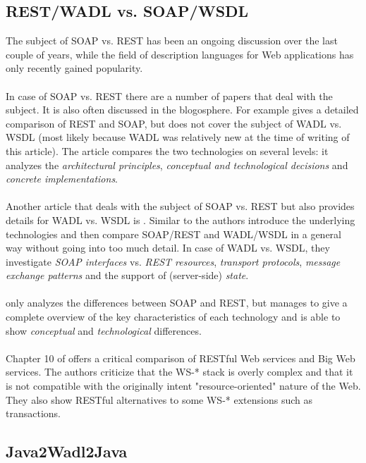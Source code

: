\subsection{REST/WADL vs. SOAP/WSDL}
The subject of SOAP vs. REST has been an ongoing discussion over the last couple of years, while the field of description languages for Web applications has only recently gained popularity.
\\ \\
In case of SOAP vs. REST there are a number of papers that deal with the subject. It is also often discussed in the blogosphere. For example \cite{BIGREST} gives a detailed comparison of REST and SOAP, but does not cover the subject of WADL vs. WSDL (most likely because WADL was relatively new at the time of writing of this article). The article compares the two technologies on several levels: it analyzes the \emph{architectural principles}, \emph{conceptual and technological decisions} and \emph{concrete implementations}.
\\ \\
Another article that deals with the subject of SOAP vs. REST but also provides details for WADL vs. WSDL is \cite{WADLWSDL}. Similar to \cite{BIGREST} the authors introduce the underlying technologies and then compare SOAP/REST and WADL/WSDL in a general way without going into too much detail. In case of WADL vs. WSDL, they investigate \emph{SOAP interfaces} vs. \emph{REST resources}, \emph{transport protocols}, \emph{message exchange patterns} and the support of (server-side) \emph{state}.
\\ \\
\cite{BRINGBACKWEB} only analyzes the differences between SOAP and REST, but manages to give a complete overview of the key characteristics of each technology and is able to show \emph{conceptual} and \emph{technological} differences.
\\ \\
Chapter 10 of \cite{RESTFULWEB} offers a critical comparison of RESTful Web services and Big Web services. The authors criticize that the WS-* stack is overly complex and that it is not compatible with the originally intent "resource-oriented" nature of the Web. They also show RESTful alternatives to some WS-* extensions such as transactions.

\subsection{Java2Wadl2Java}

